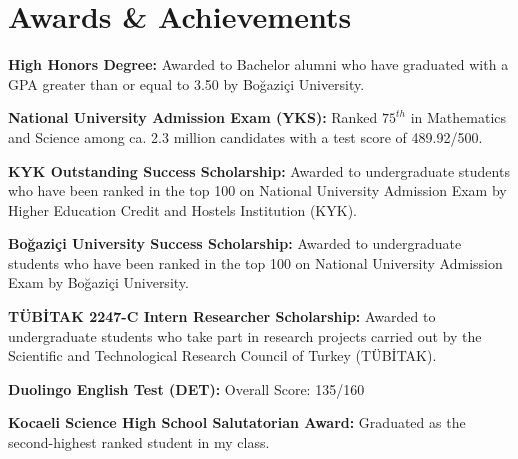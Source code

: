 \documentclass[letterpaper,11pt]{article}
\newcommand{\resumeSubHeadingListStart}{\begin{itemize}[leftmargin=0.15in, label={}]}
\newcommand{\resumeSubHeadingListEnd}{\end{itemize}}
\begin{document}
\section{Awards \& Achievements}
  \vspace{2pt}
  \resumeSubHeadingListStart
    \small{\item{
        \textbf{High Honors Degree:}{ Awarded to Bachelor alumni who have graduated with a GPA greater than or equal to 3.50 by Boğaziçi University.} \\ \vspace{3pt}

        \textbf{National University Admission Exam (YKS):}{ Ranked $75^{th}$ in Mathematics and Science among ca. 2.3 million candidates with a test score of 489.92/500.} \\ \vspace{3pt}

        \textbf{KYK Outstanding Success Scholarship:}{ Awarded to undergraduate students who have been ranked in the top 100 on National University Admission Exam by Higher Education Credit and Hostels Institution (KYK).} \\ \vspace{3pt}

        \textbf{Boğaziçi University Success Scholarship:}{ Awarded to undergraduate students who have been ranked in the top 100 on National University Admission Exam by Boğaziçi University.} \\ \vspace{3pt}

        \textbf{TÜBİTAK 2247-C Intern Researcher Scholarship:}{ Awarded to undergraduate students who take part in research projects carried out by the Scientific and Technological Research Council of Turkey (TÜBİTAK).} \\ \vspace{3pt}

        \textbf{Duolingo English Test (DET):}{ Overall Score: 135/160} \\ \vspace{3pt}


        \textbf{Kocaeli Science High School Salutatorian Award:}{ Graduated as the second-highest ranked student in my class.}
    }}
  \resumeSubHeadingListEnd
\end{document}
